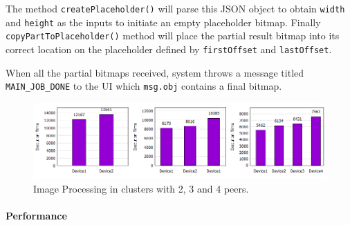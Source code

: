 \documentclass[conference]{IEEEtran}
\begin{document}
\noindent {}

The method \texttt{createPlaceholder()} will parse this JSON object to obtain \texttt{width} and \texttt{height} as the inputs to initiate an empty placeholder bitmap. Finally \texttt{copyPartToPlaceholder()} method will place the partial result bitmap into its correct location on the placeholder defined by \texttt{firstOffset} and \texttt{lastOffset}.\\

\noindent {}

When all the partial bitmaps received, system throws a message titled \texttt{MAIN\_JOB\_DONE} to the UI which \texttt{msg.obj} contains a final bitmap.

\begin{figure}[!hbt]
  \includegraphics[width=1\textwidth, natwidth=918, natheight=239]{data/c_all}
  \caption{Image Processing in clusters with 2, 3 and 4 peers.}
	\label{fig:cluster_234}
\end{figure}

\paragraph{Performance}
\end{document}
